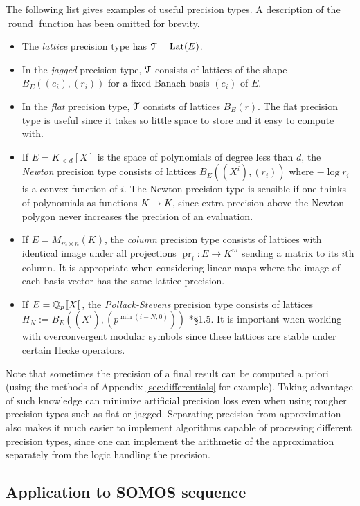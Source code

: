 \documentclass{lms}
\DeclareMathOperator{\pr}{pr}
\DeclareMathOperator{\Lat}{Lat}
\DeclareMathOperator{\round}{round}
\begin{document}
The following list gives examples of useful precision types.  A description of the $\round$ function has been omitted for brevity.
\begin{itemize}
\item The \emph{lattice} precision type has $\T = \Lat(E)$.
\item In the \emph{jagged} precision type, $\T$ consists of lattices of the shape $B_E((e_i),(r_i))$ for a fixed Banach basis $(e_i)$ of $E$.
\item In the \emph{flat} precision type, $\T$ consists of lattices $B_E(r)$.  The flat precision type is useful since it takes so little space to store and it easy to compute with.
\item If $E = K_{<d}[X]$ is the space of polynomials of degree less than $d$, the \emph{Newton} precision type consists of lattices $B_E((X^i),(r_i))$ where $-\log r_i$ is a convex function of $i$.  The Newton precision type is sensible if one thinks of polynomials as functions $K \to K$, since extra precision above the Newton polygon never increases the precision of an evaluation.
\item If $E = M_{m \times n}(K)$, the \emph{column} precision type consists of lattices with identical image under all projections $\pr_i : E \to K^m$ sending a matrix to its $i$th column.  It is appropriate when considering linear maps where the image of each basis vector has the same lattice precision.
\item If $E = \mathbb Q_p \llbracket X \rrbracket$, the \emph{Pollack-Stevens} precision type consists of lattices $H_N := B_E((X^i),(p^{\min(i-N,0)}))$ \cite{pollack-stevens:11a}*{\S 1.5}.  It is important when working with overconvergent modular symbols since these lattices are stable under certain Hecke operators.
\end{itemize}

Note that sometimes the precision of a final result can be computed
a priori (using the methods of Appendix \ref{sec:differentials} for example).
Taking advantage of such knowledge can minimize artificial precision loss
even when using rougher precision types such as flat or jagged.
Separating precision from approximation also makes
it much easier to implement algorithms capable of processing different precision types,
since one can implement the arithmetic of the approximation separately from the logic
handling the precision.

\subsection{Application to SOMOS sequence}
\label{ssec:SOMOS-solution}
\end{document}
